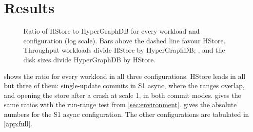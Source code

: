 \section{Results}
\label{sec:results}

\begin{figure}[t]
\centering

\caption{Ratio of HStore to HyperGraphDB for every workload and configuration (log scale). Bars above the dashed line favour HStore. Throughput workloads divide HStore by HyperGraphDB; ,  and the disk sizes divide HyperGraphDB by HStore.}
\label{fig:ratios}
\end{figure}

 shows the ratio for every workload in all three configurations. HStore leads in all but three of them: single-update commits in S1 async, where the ranges overlap, and opening the store after a crash at scale 1, in both commit modes.  gives the same ratios with the run-range test from \cref{sec:environment}.  gives the absolute numbers for the S1 async configuration. The other configurations are tabulated in \cref{app:full}.

\begin{table}[t]
\centering\footnotesize
\caption{Ratio of medians, HStore over HyperGraphDB, oriented so that values above 1 favour HStore (bold). $^\dagger$: the run ranges of the two systems overlap.}
\label{tab:summary}

\end{table}

\begin{table}[t]
\centering\footnotesize
\caption{S1 async: median throughput (operations per second), times and sizes over  runs per system.}
\label{tab:main}

\end{table}



